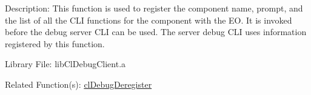 \begin{Desc}
\item[Description:]This function is used to register the component name, prompt, and the list of all the CLI functions for the component with the EO. It is invoked before the debug server CLI can be used. The server debug CLI uses information registered by this function.\end{Desc}
\begin{Desc}
\item[Library File:]lib\-Cl\-Debug\-Client.a\end{Desc}
\begin{Desc}
\item[Related Function(s):]\hyperlink{pagedbg105}{cl\-Debug\-Deregister} \end{Desc}
\newpage


